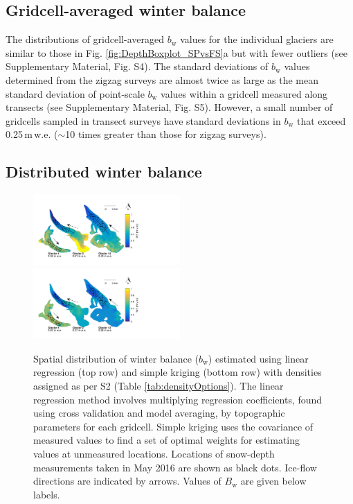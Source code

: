 \documentclass[twocolumn, letterpaper]{igs}
\begin{document}
\subsection{Gridcell-averaged winter balance}

The distributions of gridcell-averaged $b_\mathrm{w}$ values for the individual glaciers are similar to those in Fig. \ref{fig:DepthBoxplot_SPvsFS}a but with fewer outliers (see Supplementary Material, Fig. S4). The standard deviations of $b_\mathrm{w}$ values determined from the zigzag surveys are almost twice as large as the mean standard deviation of point-scale $b_\mathrm{w}$ values within a gridcell measured along transects (see Supplementary Material, Fig. S5). However, a small number of gridcells sampled in transect surveys have standard deviations in $b_\mathrm{w}$ that exceed 0.25\,m\,w.e. ($\sim$10 times greater than those for zigzag surveys). 

\subsection{Distributed winter balance}

\begin{figure}
	\centering
	\includegraphics[width =0.5\textwidth]{LR_map.pdf}\\
    \includegraphics[width =0.5\textwidth]{SK_map.pdf}\\
	\caption{Spatial distribution of winter balance ($b_\mathrm{w}$) estimated using linear regression (top row) and simple kriging (bottom row) with densities assigned as per S2 (Table \ref{tab:densityOptions}). The linear regression method involves multiplying regression coefficients, found using cross validation and model averaging, by topographic parameters for each gridcell. Simple kriging uses the covariance of measured values to find a set of optimal weights for estimating values at unmeasured locations. Locations of snow-depth measurements taken in May 2016 are shown as black dots. Ice-flow directions are indicated by arrows. Values of $B_\mathrm{w}$ are given below labels.}
	\label{fig:LR_SK_map}
\end{figure}
\end{document}
